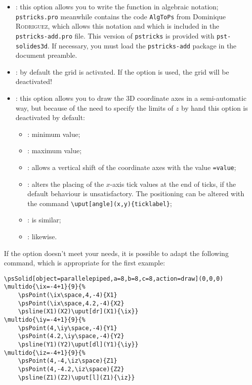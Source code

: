 \begin{itemize}
  \item {}: this option allows you to write the function in
algebraic notation; \texttt{pstricks.pro} meanwhile contains
the code \texttt{AlgToPs}
   from Dominique \textsc{Rodriguez}, which allows this notation and which is
included in the \texttt{pstricks-add.pro} file. This version
of \texttt{pstricks} %
   is provided with \texttt{pst-solides3d}. If necessary, you must load the
\texttt{pstricks-add} package in the document preamble.
  \item {}: by default the grid is activated. If the
  option  is used, the grid will be deactivated! %
  \item {}: this option allows you to draw the 3D
  coordinate axes
in a semi-automatic way, but because of the need to specify
the limits of $z$ by hand this option is deactivated by
default:
   \begin{itemize}
     \item {}: minimum value;
     \item {}: maximum value;
     \item {}: allows a vertical shift of the coordinate axes
with the value \texttt{=value};
     \item {}: alters the placing of the $x$-axis tick values
     at the end of ticks, if the default behaviour is unsatisfactory.
     The positioning can be altered with the command
\verb+\uput[angle](x,y){ticklabel}+;
     \item {}: is similar;
     \item {}: likewise.
   \end{itemize}
\end{itemize}
If the option  doesn't meet your needs, it is
possible to adapt the following command, which is appropriate for
the first example:



\small
\begin{verbatim}
\psSolid[object=parallelepiped,a=8,b=8,c=8,action=draw](0,0,0)
\multido{\ix=-4+1}{9}{%
    \psPoint(\ix\space,4,-4){X1}
    \psPoint(\ix\space,4.2,-4){X2}
    \psline(X1)(X2)\uput[dr](X1){\ix}}
\multido{\iy=-4+1}{9}{%
    \psPoint(4,\iy\space,-4){Y1}
    \psPoint(4.2,\iy\space,-4){Y2}
    \psline(Y1)(Y2)\uput[dl](Y1){\iy}}
\multido{\iz=-4+1}{9}{%
    \psPoint(4,-4,\iz\space){Z1}
    \psPoint(4,-4.2,\iz\space){Z2}
    \psline(Z1)(Z2)\uput[l](Z1){\iz}}
\end{verbatim}

